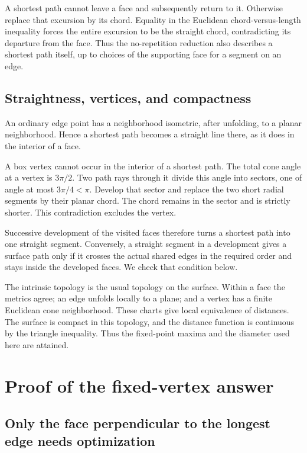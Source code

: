 \documentclass[11pt]{article}
\theoremstyle{definition}
\begin{document}
A shortest path cannot leave a face and subsequently return to it.
Otherwise replace that excursion by its chord. Equality in the
Euclidean chord-versus-length inequality forces the entire excursion
to be the straight chord, contradicting its departure from the face.
Thus the no-repetition reduction also describes a shortest path itself,
up to choices of the supporting face for a segment on an edge.

\subsection{Straightness, vertices, and compactness}

An ordinary edge point has a neighborhood isometric, after unfolding,
to a planar neighborhood. Hence a shortest path becomes a straight
line there, as it does in the interior of a face.

A box vertex cannot occur in the interior of a shortest path.
The total cone angle at a vertex is \(3\pi/2\). Two path rays through
it divide this angle into sectors, one of angle at most \(3\pi/4<\pi\).
Develop that sector and replace the two short radial segments by
their planar chord. The chord remains in the sector and is strictly
shorter. This contradiction excludes the vertex.

Successive development of the visited faces therefore turns a shortest
path into one straight segment. Conversely, a straight segment in a
development gives a surface path only if it crosses the actual shared
edges in the required order and stays inside the developed faces.
We check that condition below.

The intrinsic topology is the usual topology on the surface.
Within a face the metrics agree; an edge unfolds locally to a plane;
and a vertex has a finite Euclidean cone neighborhood. These charts
give local equivalence of distances. The surface is compact in this
topology, and the distance function is continuous by the triangle
inequality. Thus the fixed-point maxima and the diameter used here
are attained.

\section{Proof of the fixed-vertex answer}

\subsection{Only the face perpendicular to the longest edge needs optimization}
\end{document}
